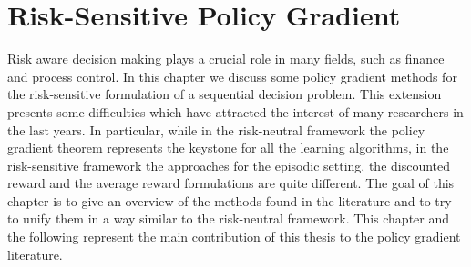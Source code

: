 \chapter{Risk-Sensitive Policy Gradient}

Risk aware decision making plays a crucial role in many fields, such as finance and process control. In this chapter we discuss some policy gradient methods for the risk-sensitive formulation of a sequential decision problem. This extension presents some difficulties which have attracted the interest of many researchers in the last years. In particular, while in the risk-neutral framework the policy gradient theorem represents the keystone for all the learning algorithms, in the risk-sensitive framework the approaches for the episodic setting, the discounted reward and the average reward formulations are quite different. The goal of this chapter is to give an overview of the methods found in the literature and to try to unify them in a way similar to the risk-neutral framework. This chapter and the following represent the main contribution of this thesis to the policy gradient literature.    

